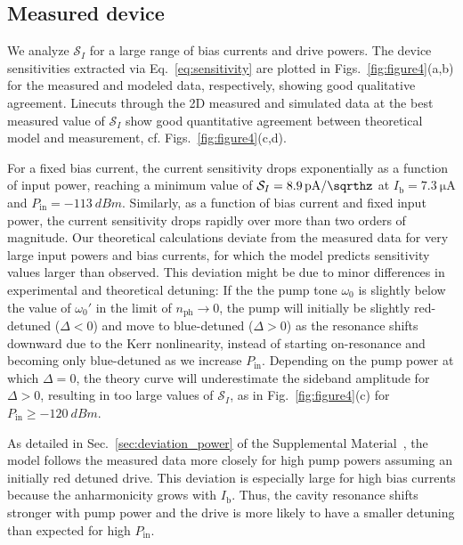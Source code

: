 \subsection{Measured device}
% 
We analyze $\mathcal{S}_I$ for a large range of bias currents and drive powers.
% 
The device sensitivities extracted via Eq.~\eqref{eq:sensitivity} are plotted in Figs.~\ref{fig:figure4}(a,b) for the measured and modeled data, respectively, showing good qualitative agreement.
% 
Linecuts through the 2D measured and simulated data at the best measured value of $\mathcal{S}_I$ show good quantitative agreement between theoretical model and measurement, cf. Figs.~\ref{fig:figure4}(c,d).

For a fixed bias current, the current sensitivity drops exponentially as a function of input power, reaching a minimum value of $\mathcal{S}_I=\SI{8.9}{\pico\ampere/\sqrthz}$ at $I_\text{b}=\SI{7.3}{\micro\ampere}$ and $P_\text{in}=\SI{-113}{dBm}$.
% 
Similarly, as a function of bias current and fixed input power, the current sensitivity drops rapidly over more than two orders of magnitude.
% 
Our theoretical calculations deviate from the measured data for very large input powers and bias currents, for which the model predicts sensitivity values larger than observed.
% 
This deviation might be due to minor differences in experimental and theoretical detuning:
% 
If the the pump tone $\omega_0$ is slightly below the value of $\omega_0'$ in the limit of $n_\text{ph}\rightarrow0$, the pump will initially be slightly red-detuned ($\Delta<0$) and move to blue-detuned ($\Delta>0$) as the resonance shifts downward due to the Kerr nonlinearity, instead of starting on-resonance and becoming only blue-detuned as we increase $P_\text{in}$.
% 
Depending on the pump power at which $\Delta=0$, the theory curve will underestimate the sideband amplitude for $\Delta>0$, resulting in too large values of $\mathcal{S}_I$, as in Fig.~\ref{fig:figure4}(c) for $P_\text{in}\geq\SI{-120}{dBm}$.

As detailed in Sec.~\ref{sec:deviation_power} of the Supplemental Material~\cite{SeeSupplementalMaterial}, the model follows the measured data more closely for high pump powers assuming an initially red detuned drive.
% 
This deviation is especially large for high bias currents because the anharmonicity grows with $I_\text{b}$.
% 
Thus, the cavity resonance shifts stronger with pump power and the drive is more likely to have a smaller detuning than expected for high $P_\text{in}$.


